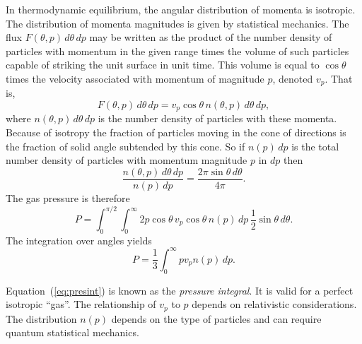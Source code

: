 \documentclass[10pt,amsmath,amssymb,aps,pra]{revtex4-2}
\begin{document}
In thermodynamic equilibrium, the angular distribution of momenta is isotropic.
The distribution of momenta magnitudes is given by statistical mechanics. The
flux $F(\theta,p)\,d\theta\,dp$ may be written as the product of the number
density of particles with momentum in the given range times the volume of such
particles capable of striking the unit surface in unit time. This volume is
equal to $\cos{\theta}$ times the velocity associated with momentum of magnitude
$p$, denoted $v_p$. That is,
\begin{equation}
F(\theta,p)\,d\theta\,dp = v_p\cos{\theta}\,n(\theta,p)\,d\theta\,dp,
\end{equation}
where $n(\theta,p)\,d\theta\,dp$ is the number density of particles with these
momenta. Because of isotropy the fraction of particles moving in the cone of
directions is the fraction of solid angle subtended by this cone. So if
$n(p)\,dp$ is the total number density of particles with momentum magnitude $p$
in $dp$ then
\begin{equation}
\frac{n(\theta,p)\,d\theta\,dp}{n(p)\,dp} =
\frac{2\pi\sin{\theta}\,d\theta}{4\pi}.
\end{equation}
The gas pressure is therefore
\begin{equation}
P = \int_{0}^{\pi/2}\int_{0}^{\infty}
2p\cos{\theta}\,v_p\cos{\theta}\,n(p)\,dp\,\frac{1}{2}\sin{\theta}\,d\theta.
\end{equation}
The integration over angles yields
\begin{equation}\label{eq:presint}
P = \frac{1}{3}\int_{0}^{\infty}pv_pn(p)\,dp.
\end{equation}

Equation~(\ref{eq:presint}) is known as the \emph{pressure integral}. It is
valid for a perfect isotropic ``gas''. The relationship of $v_p$ to $p$ depends
on relativistic considerations. The distribution $n(p)$ depends on the type of
particles and can require quantum statistical mechanics.
\end{document}

